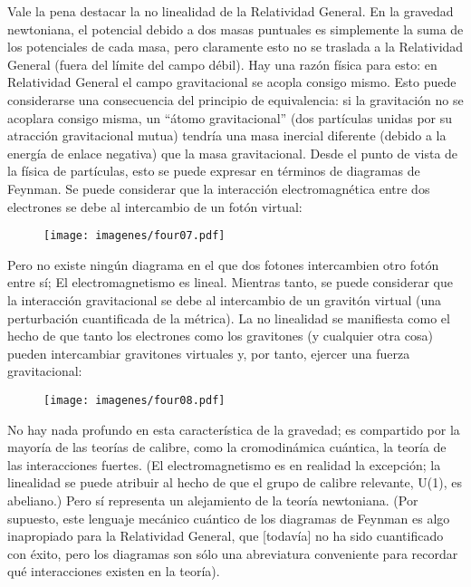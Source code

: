 \documentclass[11pt,b5paper,openany,twoside]{book}
\begin{document}
Vale la pena destacar la no linealidad de la Relatividad General.
En la gravedad newtoniana, el potencial debido a dos masas puntuales es simplemente la suma de los potenciales de cada masa, pero claramente esto no se traslada a la Relatividad General (fuera del límite del campo débil).
Hay una razón física para esto: en Relatividad General el campo gravitacional se acopla consigo mismo.
Esto puede considerarse una consecuencia del principio de equivalencia: si la gravitación no se acoplara consigo misma, un ``átomo gravitacional'' (dos partículas unidas por su atracción gravitacional mutua) tendría una masa inercial diferente (debido a la energía de enlace negativa) que la masa gravitacional.
Desde el punto de vista de la física de partículas, esto se puede expresar en términos de diagramas de Feynman.
Se puede considerar que la interacción electromagnética entre dos electrones se debe al intercambio de un fotón virtual:

\begin{figure}[h]
\centering
\texttt{[image: imagenes/four07.pdf]}
\end{figure}

\noindent
Pero no existe ningún diagrama en el que dos fotones intercambien otro fotón entre sí; El electromagnetismo es lineal.
Mientras tanto, se puede considerar que la interacción gravitacional se debe al intercambio de un gravitón virtual (una perturbación cuantificada de la métrica).
La no linealidad se manifiesta como el hecho de que tanto los electrones como los gravitones (y cualquier otra cosa) pueden intercambiar gravitones virtuales y, por tanto, ejercer una fuerza gravitacional:

\begin{figure}[h]
\centering
\texttt{[image: imagenes/four08.pdf]}
\end{figure}

\noindent
No hay nada profundo en esta característica de la gravedad; es compartido por la mayoría de las teorías de calibre, como la cromodinámica cuántica, la teoría de las interacciones fuertes.
(El electromagnetismo es en realidad la excepción; la linealidad se puede atribuir al hecho de que el grupo de calibre relevante, U(1), es abeliano.)
Pero sí representa un alejamiento de la teoría newtoniana.
(Por supuesto, este lenguaje mecánico cuántico de los diagramas de Feynman es algo inapropiado para la Relatividad General, que [todavía] no ha sido cuantificado con éxito, pero los diagramas son sólo una abreviatura conveniente para recordar qué interacciones existen en la teoría).
\end{document}

